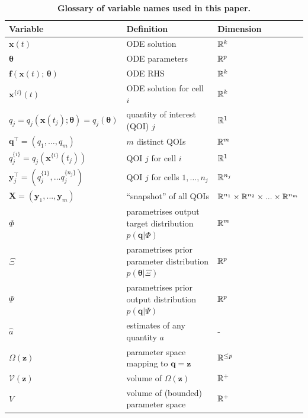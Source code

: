 \begin{table}[htbp]
\centering
\begin{adjustwidth}{-0.5in}{0in}%
\begin{tabularx}{1.2\textwidth}{lll}
Variable	                                                & Definition                                   & Dimension \\
\toprule
$\boldsymbol{x}(t)$                                     	& ODE solution                                 & $\mathbb{R}^k$ \\
$\boldsymbol{\theta}$                                     	& ODE parameters                               & $\mathbb{R}^p$ \\
$\boldsymbol{f}(\boldsymbol{x}(t); \, \boldsymbol{\theta})$	& ODE RHS                                      & $\mathbb{R}^k$ \\
$\boldsymbol{x}^{\{i\}}(t)$                                 & ODE solution for cell $i$                    & $\mathbb{R}^k$ \\
$q_j= q_j(\boldsymbol{x}(t_j);\boldsymbol{\theta}) = q_j(\boldsymbol{\theta})$                             & quantity of interest (QOI) $j$               & $\mathbb{R}^1$ \\
$\boldsymbol{q}^\top= \left( q_1, \dots, q_m \right)$            & $m$ distinct QOIs                            & $\mathbb{R}^m$ \\
$q_j^{\{i\}}= q_j(\boldsymbol{x}^{\{i\}}(t_j))$             & QOI $j$ for cell $i$                         & $\mathbb{R}^1$ \\
$\boldsymbol{y}_j^\top=\left( q_j^{\{1\}}, \dots q_j^{\{n_j\}} \right)$  & QOI $j$ for cells $1, \dots, n_j$    & $\mathbb{R}^{n_j}$ \\
$\boldsymbol{X}=(\boldsymbol{y}_1,...,\boldsymbol{y}_m)$    & ``snapshot'' of all QOIs                      & $\mathbb{R}^{n_1} \times \mathbb{R}^{n_2}\times...\times\mathbb{R}^{n_m}$ \\
$\Phi$ & parametrises output target distribution $p(\boldsymbol{q}|\Phi)$              & $\mathbb{R}^m$ \\
$\Xi$  & parametrises prior parameter distribution $p(\boldsymbol{\theta}|\Xi)$        & $\mathbb{R}^p$ \\
$\Psi$ & parametrises prior output distribution $p(\boldsymbol{q}|\Psi)$               & $\mathbb{R}^p$ \\
$\hat{a}$ & estimates of any quantity $a$                                                                  & - \\
$\Omega(\boldsymbol{z})$              & parameter space mapping to $\boldsymbol{q}=\boldsymbol{z}$         & $\mathbb{R}^{\leq p}$ \\
$\mathcal{V}(\boldsymbol{z})$         & volume of $\Omega(\boldsymbol{z})$                                 & $\mathbb{R}^+$ \\
$V$                                   & volume of (bounded) parameter space                                          & $\mathbb{R}^+$ \\
\end{tabularx}
\caption{\textbf{Glossary of variable names used in this paper.}}
\label{tab:variable_glossary}
\end{adjustwidth}
\end{table}




